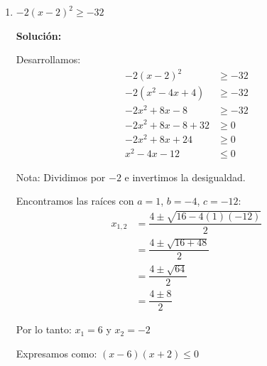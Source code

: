 \documentclass[12pt]{article}
\newcommand{\solucion}{%
    \vspace{0.8em}%
    \textbf{Solución:}%
}
\begin{document}
\begin{enumerate}[label=\alph*.-]
    El conjunto solución es:
    \[
    \boxed{CS = (-\infty, -3) \cup (11, \infty)}
    \]

    \textbf{Representación gráfica:}

    \begin{center}
    \end{center}

    \newpage
    \item $-2(x - 2)^2 \geq -32$

    \solucion

    Desarrollamos:
    \begin{align*}
    -2(x - 2)^2 &\geq -32 \\[0.3em]
    -2(x^2 - 4x + 4) &\geq -32 \\[0.3em]
    -2x^2 + 8x - 8 &\geq -32 \\[0.3em]
    -2x^2 + 8x - 8 + 32 &\geq 0 \\[0.3em]
    -2x^2 + 8x + 24 &\geq 0 \\[0.3em]
    x^2 - 4x - 12 &\leq 0
    \end{align*}

    Nota: Dividimos por $-2$ e invertimos la desigualdad.

    Encontramos las raíces con $a = 1$, $b = -4$, $c = -12$:
    \begin{align*}
    x_{1,2} &= \dfrac{4 \pm \sqrt{16 - 4(1)(-12)}}{2} \\[0.3em]
    &= \dfrac{4 \pm \sqrt{16 + 48}}{2} \\[0.3em]
    &= \dfrac{4 \pm \sqrt{64}}{2} \\[0.3em]
    &= \dfrac{4 \pm 8}{2}
    \end{align*}

    Por lo tanto: $x_1 = 6$ y $x_2 = -2$

    Expresamos como: $(x - 6)(x + 2) \leq 0$


\end{enumerate}
\end{document}
